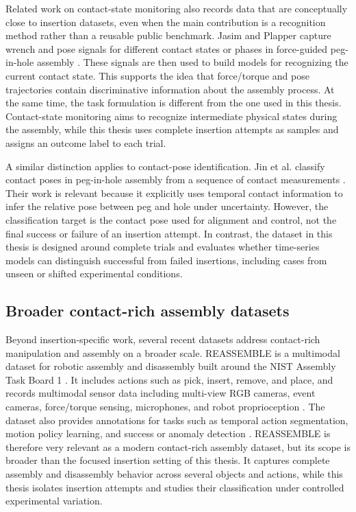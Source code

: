 Related work on contact-state monitoring also records data that are conceptually close to insertion datasets, even when the main contribution is a recognition method rather than a reusable public benchmark. Jasim and Plapper capture wrench and pose signals for different contact states or phases in force-guided peg-in-hole assembly \cite{jasimContactstateMonitoringForceguided2014}. These signals are then used to build models for recognizing the current contact state. This supports the idea that force/torque and pose trajectories contain discriminative information about the assembly process. At the same time, the task formulation is different from the one used in this thesis. Contact-state monitoring aims to recognize intermediate physical states during the assembly, while this thesis uses complete insertion attempts as samples and assigns an outcome label to each trial.

A similar distinction applies to contact-pose identification. Jin et al. classify contact poses in peg-in-hole assembly from a sequence of contact measurements \cite{jinContactPoseIdentification2021a}. Their work is relevant because it explicitly uses temporal contact information to infer the relative pose between peg and hole under uncertainty. However, the classification target is the contact pose used for alignment and control, not the final success or failure of an insertion attempt. In contrast, the dataset in this thesis is designed around complete trials and evaluates whether time-series models can distinguish successful from failed insertions, including cases from unseen or shifted experimental conditions.

\subsection{Broader contact-rich assembly datasets}

Beyond insertion-specific work, several recent datasets address contact-rich manipulation and assembly on a broader scale. REASSEMBLE is a multimodal dataset for robotic assembly and disassembly built around the NIST Assembly Task Board 1 \cite{sliwowskiREASSEMBLEMultimodalDataset2025}. It includes actions such as pick, insert, remove, and place, and records multimodal sensor data including multi-view RGB cameras, event cameras, force/torque sensing, microphones, and robot proprioception \cite{sliwowskiREASSEMBLEMultimodalDataset2025}. The dataset also provides annotations for tasks such as temporal action segmentation, motion policy learning, and success or anomaly detection \cite{sliwowskiREASSEMBLEMultimodalDataset2025}. REASSEMBLE is therefore very relevant as a modern contact-rich assembly dataset, but its scope is broader than the focused insertion setting of this thesis. It captures complete assembly and disassembly behavior across several objects and actions, while this thesis isolates insertion attempts and studies their classification under controlled experimental variation.

